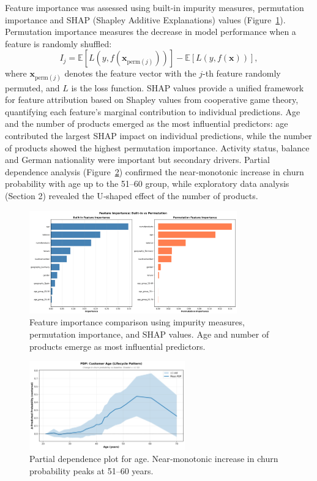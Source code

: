\documentclass[12pt]{article}
\begin{document}
Feature importance was assessed using built‑in impurity measures, permutation importance and SHAP (Shapley Additive Explanations) values (Figure~\ref{fig:feature_importance}).  Permutation importance measures the decrease in model performance when a feature is randomly shuffled:
\[ I_j = \mathbb{E}[L(y, f(\mathbf{x}_{\text{perm}(j)}))] - \mathbb{E}[L(y, f(\mathbf{x}))], \]
where \(\mathbf{x}_{\text{perm}(j)}\) denotes the feature vector with the \(j\)-th feature randomly permuted, and \(L\) is the loss function.  SHAP values provide a unified framework for feature attribution based on Shapley values from cooperative game theory, quantifying each feature's marginal contribution to individual predictions.  Age and the number of products emerged as the most influential predictors: age contributed the largest SHAP impact on individual predictions, while the number of products showed the highest permutation importance.  Activity status, balance and German nationality were important but secondary drivers.  Partial dependence analysis (Figure~\ref{fig:pdp_age}) confirmed the near‑monotonic increase in churn probability with age up to the 51–60 group, while exploratory data analysis (Section 2) revealed the U‑shaped effect of the number of products.

\begin{figure}[H]
\centering
\includegraphics[width=0.8\textwidth]{img/15_feature_importance_comparison.png}
\caption{Feature importance comparison using impurity measures, permutation importance, and SHAP values. Age and number of products emerge as most influential predictors.}
\label{fig:feature_importance}
\end{figure}

\begin{figure}[H]
\centering
\includegraphics[width=0.6\textwidth]{img/18_pdp_age.png}
\caption{Partial dependence plot for age. Near‑monotonic increase in churn probability peaks at 51–60 years.}
\label{fig:pdp_age}
\end{figure}
\end{document}
